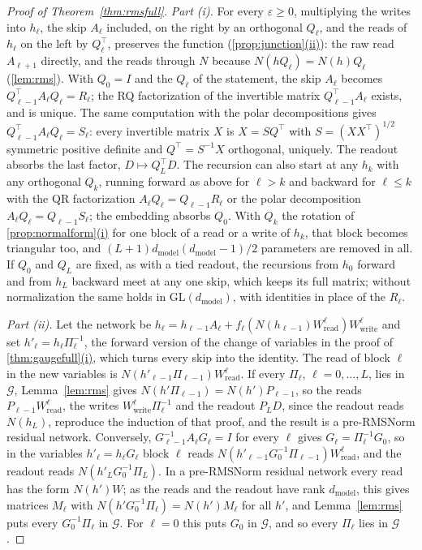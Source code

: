 \documentclass[10pt]{article}
\theoremstyle{definition}
\theoremstyle{remark}
\newcommand{\Wread}{W_{\mathrm{read}}}
\newcommand{\Wwrite}{W_{\mathrm{write}}}
\newcommand{\dm}{d_{\mathrm{model}}}
\newcommand{\GL}{\mathrm{GL}}
\newcommand{\G}{\mathcal{G}}
\DeclareRobustCommand{\cpref}[2]{\hyperref[#1:#2]{\cref*{#1}(#2)}}
\begin{document}
\begin{proof}[Proof of Theorem~\ref{thm:rmsfull}]
\emph{Part (i).} For every $\varepsilon \ge 0$, multiplying the writes into $h_\ell$, the skip $A_\ell$ included, on the right by an orthogonal $Q_\ell$, and the reads of $h_\ell$ on the left by $Q_\ell^\top$, preserves the function (\cpref{prop:junction}{ii}): the raw read $A_{\ell+1}$ directly, and the reads through $N$ because $N(hQ_\ell) = N(h)Q_\ell$ (\cref{lem:rms}). With $Q_0 = I$ and the $Q_\ell$ of the statement, the skip $A_\ell$ becomes $Q_{\ell-1}^\top A_\ell Q_\ell = R_\ell$; the RQ factorization of the invertible matrix $Q_{\ell-1}^\top A_\ell$ exists, and is unique. The same computation with the polar decompositions gives $Q_{\ell-1}^\top A_\ell Q_\ell = S_\ell$: every invertible matrix $X$ is $X = SQ^\top$ with $S = (XX^\top)^{1/2}$ symmetric positive definite and $Q^\top = S^{-1}X$ orthogonal, uniquely. The readout absorbs the last factor, $D \mapsto Q_L^\top D$. The recursion can also start at any $h_k$ with any orthogonal $Q_k$, running forward as above for $\ell > k$ and backward for $\ell \le k$ with the QR factorization $A_\ell Q_\ell = Q_{\ell-1}R_\ell$ or the polar decomposition $A_\ell Q_\ell = Q_{\ell-1}S_\ell$; the embedding absorbs $Q_0$. With $Q_k$ the rotation of \cpref{prop:normalform}{i} for one block of a read or a write of $h_k$, that block becomes triangular too, and $(L+1)\dm(\dm-1)/2$ parameters are removed in all. If $Q_0$ and $Q_L$ are fixed, as with a tied readout, the recursions from $h_0$ forward and from $h_L$ backward meet at any one skip, which keeps its full matrix; without normalization the same holds in $\GL(\dm)$, with identities in place of the $R_\ell$.

\emph{Part (ii).} Let the network be $h_\ell = h_{\ell-1}A_\ell + f_\ell(N(h_{\ell-1})\Wread^{\ell})\Wwrite^{\ell}$ and set $h'_\ell = h_\ell\Pi_\ell^{-1}$, the forward version of the change of variables in the proof of \cpref{thm:gaugefull}{i}, which turns every skip into the identity. The read of block $\ell$ in the new variables is $N(h'_{\ell-1}\Pi_{\ell-1})\Wread^{\ell}$. If every $\Pi_\ell$, $\ell = 0, \dots, L$, lies in $\G$, Lemma~\ref{lem:rms} gives $N(h'\Pi_{\ell-1}) = N(h')P_{\ell-1}$, so the reads $P_{\ell-1}\Wread^{\ell}$, the writes $\Wwrite^{\ell}\Pi_\ell^{-1}$ and the readout $P_LD$, since the readout reads $N(h_L)$, reproduce the induction of that proof, and the result is a pre-RMSNorm residual network. Conversely, $G_{\ell-1}^{-1}A_\ell G_\ell = I$ for every $\ell$ gives $G_\ell = \Pi_\ell^{-1}G_0$, so in the variables $h'_\ell = h_\ell G_\ell$ block $\ell$ reads $N(h'_{\ell-1}G_0^{-1}\Pi_{\ell-1})\Wread^{\ell}$, and the readout reads $N(h'_LG_0^{-1}\Pi_L)$. In a pre-RMSNorm residual network every read has the form $N(h')W$; as the reads and the readout have rank $\dm$, this gives matrices $M_\ell$ with $N(h'G_0^{-1}\Pi_\ell) = N(h')M_\ell$ for all $h'$, and Lemma~\ref{lem:rms} puts every $G_0^{-1}\Pi_\ell$ in $\G$. For $\ell = 0$ this puts $G_0$ in $\G$, and so every $\Pi_\ell$ lies in $\G$.


\end{proof}
\end{document}
